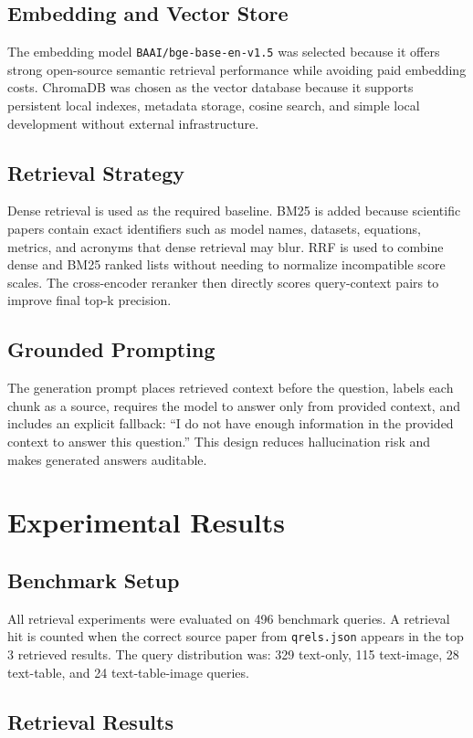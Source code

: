 \documentclass[11pt]{article}
\newcommand{\code}[1]{\texttt{#1}}
\begin{document}
\subsection{Embedding and Vector Store}
The embedding model \code{BAAI/bge-base-en-v1.5} was selected because it offers strong open-source semantic retrieval performance while avoiding paid embedding costs. ChromaDB was chosen as the vector database because it supports persistent local indexes, metadata storage, cosine search, and simple local development without external infrastructure.

\subsection{Retrieval Strategy}
Dense retrieval is used as the required baseline. BM25 is added because scientific papers contain exact identifiers such as model names, datasets, equations, metrics, and acronyms that dense retrieval may blur. RRF is used to combine dense and BM25 ranked lists without needing to normalize incompatible score scales. The cross-encoder reranker then directly scores query-context pairs to improve final top-k precision.

\subsection{Grounded Prompting}
The generation prompt places retrieved context before the question, labels each chunk as a source, requires the model to answer only from provided context, and includes an explicit fallback: ``I do not have enough information in the provided context to answer this question.'' This design reduces hallucination risk and makes generated answers auditable.

\section{Experimental Results}

\subsection{Benchmark Setup}
All retrieval experiments were evaluated on 496 benchmark queries. A retrieval hit is counted when the correct source paper from \code{qrels.json} appears in the top 3 retrieved results. The query distribution was: 329 text-only, 115 text-image, 28 text-table, and 24 text-table-image queries.

\subsection{Retrieval Results}
\end{document}
